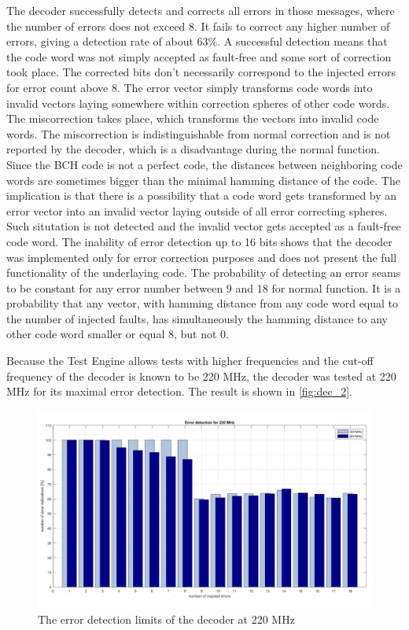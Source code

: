 The decoder successfully detects and corrects all errors in those messages, where the number of errors does not exceed 8. It fails to correct any higher number of errors, giving a detection rate of about 63\%. A successful detection means that the code word was not simply accepted as fault-free and some sort of correction took place. The corrected bits don't necessarily correspond to the injected errors for error count above 8. The error vector simply transforms code words into invalid vectors laying somewhere within correction spheres of other code words. The miscorrection takes place, which transforms the vectors into invalid code words. The miscorrection is indistinguishable from normal correction and is not reported by the decoder, which is a disadvantage during the normal function. Since the BCH code is not a perfect code, the distances between neighboring code words are sometimes bigger than the minimal hamming distance of the code. The implication is that there is a possibility that a code word gets transformed by an error vector into an invalid vector laying outside of all error correcting spheres. Such situtation is not detected and the invalid vector gets accepted as a fault-free code word. The inability of error detection up to 16 bits shows that the decoder was implemented only for error correction purposes and does not present the full functionality of the underlaying code. The probability of detecting an error seams to be constant for any error number between 9 and 18 for normal function. It is a probability that any vector, with hamming distance from any code word equal to the number of injected faults, has simultaneously the hamming distance to any other code word smaller or equal 8, but not 0. 

Because the Test Engine allows tests with higher frequencies and the cut-off frequency of the decoder is known to be 220 MHz, the decoder was tested at 220 MHz for its maximal error detection. The result is shown in \autoref{fig:dec_2}. 

\begin{figure}[h]
\centering
\includegraphics[width=\textwidth]{figures/max_detection_220.png}
\caption{The error detection limits of the decoder at 220 MHz}
\label{fig:dec_2}
\end{figure}

